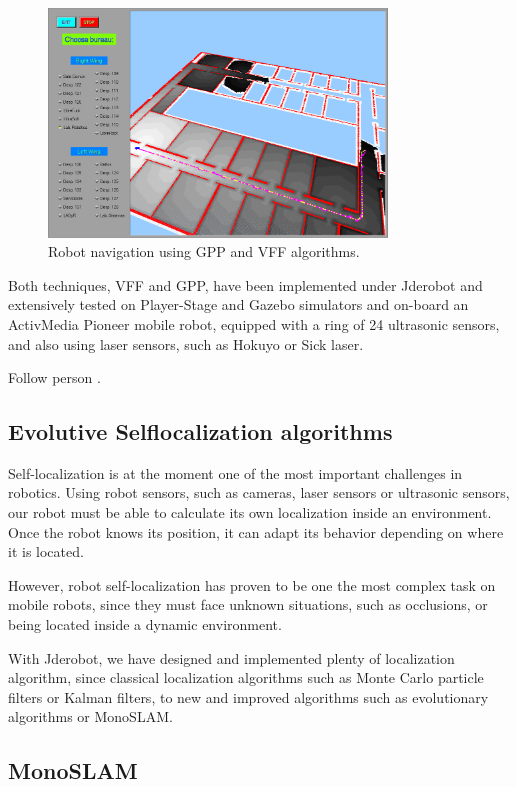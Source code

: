 \documentclass[twocolumn]{svjour3}          %
\begin{document}
\begin{figure}
  \includegraphics[width=9cm]{figs/gppNav.png}
\caption{Robot navigation using GPP and VFF algorithms.}
\label{fig:gppNav}
\end{figure}

Both techniques, VFF and GPP, have been implemented under Jderobot and extensively tested on Player-Stage and Gazebo simulators and on-board an ActivMedia Pioneer mobile robot, equipped with a ring of 24 ultrasonic sensors, and also using laser sensors, such as Hokuyo or Sick laser.

Follow person \cite{canas05d}.

\subsection{Evolutive Selflocalization algorithms}

Self-localization is at the moment one of the most important challenges in robotics. Using robot sensors, such as cameras, laser sensors or ultrasonic sensors, our robot must be able to calculate its own localization inside an environment. Once the robot knows its position, it can adapt its behavior depending on where it is located. 
 
However, robot self-localization has proven to be one the most complex task on mobile robots, since they must face unknown situations, such as occlusions, or being located inside a dynamic environment.

With Jderobot, we have designed and implemented plenty of localization algorithm, since classical localization algorithms such as Monte Carlo particle filters or Kalman filters, to new and improved algorithms such as evolutionary algorithms or MonoSLAM.

\subsection{MonoSLAM}
\end{document}
